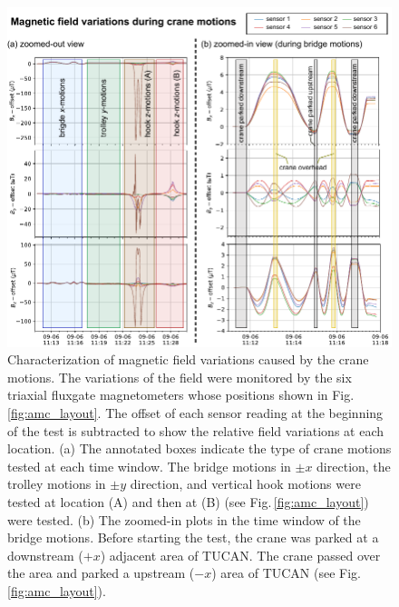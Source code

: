 \begin{figure}[htbp!]
\centering
\includegraphics[width=\textwidth]{graphics/AMC/crane_test.pdf}
\caption{Characterization of magnetic field variations caused by the crane motions. The variations of the field were monitored by the six triaxial fluxgate magnetometers whose positions shown in Fig.\,\ref{fig:amc_layout}. The offset of each sensor reading at the beginning of the test is subtracted to show the relative field variations at each location. 
(a) The annotated boxes indicate the type of crane motions tested at each time window. The bridge motions in $\pm x$ direction, the trolley motions in $\pm y$ direction, and vertical hook motions were tested at location (A) and then at (B) (see Fig.\,\ref{fig:amc_layout}) were tested. (b) The zoomed-in plots in the time window of the bridge motions. Before starting the test, the crane was parked at a downstream ($+x$)  adjacent area of TUCAN. The crane passed over the area and parked a upstream ($-x$) area of TUCAN (see Fig.\,\ref{fig:amc_layout}).
} 
\label{fig:amc_crane}
\end{figure}
